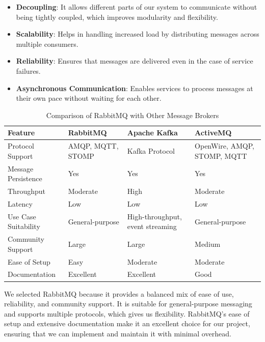 \begin{itemize}
    \item \textbf{Decoupling}: It allows different parts of our system to communicate without being tightly coupled, which improves modularity and flexibility.
    \item \textbf{Scalability}: Helps in handling increased load by distributing messages across multiple consumers.
    \item \textbf{Reliability}: Ensures that messages are delivered even in the case of service failures.
    \item \textbf{Asynchronous Communication}: Enables services to process messages at their own pace without waiting for each other.
\end{itemize}

\begin{table}[H]
    \centering
    \begin{tabularx}{\linewidth}{|l|X|X|X|}
        \hline
        \textbf{Feature} & \textbf{RabbitMQ} & \textbf{Apache Kafka} & \textbf{ActiveMQ} \\ \hline
        Protocol Support & AMQP, MQTT, STOMP & Kafka Protocol & OpenWire, AMQP, STOMP, MQTT \\ \hline
        Message Persistence & Yes & Yes & Yes \\ \hline
        Throughput & Moderate & High & Moderate \\ \hline
        Latency & Low & Low & Low \\ \hline
        Use Case Suitability & General-purpose & High-throughput, event streaming & General-purpose \\ \hline
        Community Support & Large & Large & Medium \\ \hline
        Ease of Setup & Easy & Moderate & Moderate \\ \hline
        Documentation & Excellent & Excellent & Good \\ \hline
    \end{tabularx}
    \caption{Comparison of RabbitMQ with Other Message Brokers}
    \label{tab:message-broker-comparison}
\end{table}
We selected RabbitMQ because it provides a balanced mix of ease of use, reliability, and community support. It is suitable for general-purpose messaging and supports multiple protocols, which gives us flexibility. RabbitMQ's ease of setup and extensive documentation make it an excellent choice for our project, ensuring that we can implement and maintain it with minimal overhead.

